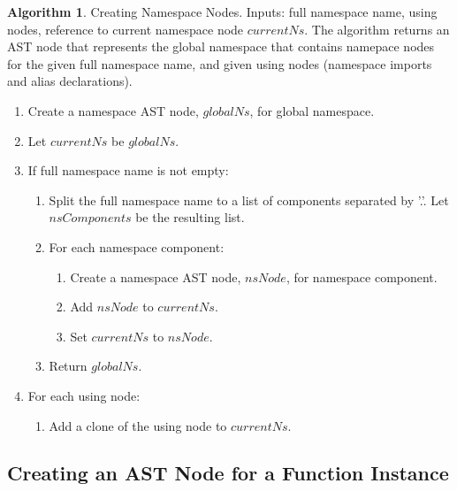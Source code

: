 \documentclass[a4paper,oneside,11pt]{book}
\theoremstyle{definition}
\newtheorem{algo}{Algorithm}[section]
\begin{document}
\begin{algo}\label{creatingns} Creating Namespace Nodes. Inputs: full namespace name, using nodes, reference to current namespace node $currentNs$.
The algorithm returns an AST node that represents the global namespace that contains namepace nodes for the given full namespace name,
and given using nodes (namespace imports and alias declarations).
\begin{enumerate}
\item
Create a namespace AST node, $globalNs$, for global namespace.
\item
Let $currentNs$ be $globalNs$.
\item
If full namespace name is not empty:
\begin{enumerate}
\item
Split the full namespace name to a list of components separated by '.'. Let $nsComponents$ be the resulting list.
\item
For each namespace component:
\begin{enumerate}
\item
Create a namespace AST node, $nsNode$, for namespace component.
\item
Add $nsNode$ to $currentNs$.
\item
Set $currentNs$ to $nsNode$.
\end{enumerate}
\item
Return $globalNs$.
\end{enumerate}
\item
For each using node:
\begin{enumerate}
\item
Add a clone of the using node to $currentNs$.
\end{enumerate}
\end{enumerate}
\end{algo}

\subsection{Creating an AST Node for a Function Instance}
\end{document}
